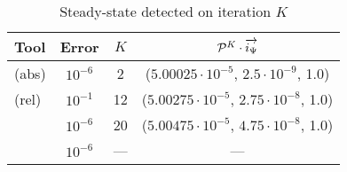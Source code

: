 \documentclass[times, 10pt,twocolumn]{article}
\begin{document}
	\begin{table}[h]
	{\footnotesize
		\caption{Steady-state detected on iteration $K$}
		\begin{center}
			\begin{tabular}{|l|c|c|c|}
				\hline
				Tool 		& Error &	$K$	& $\mathcal{P}^{K} \cdot \overrightarrow{i_{\Psi}}$ \\
				\hline
				\prism (abs)	& $10^{-6}$ &	 2	&	($5.00025 \cdot 10^{-5}$, $2.5 \cdot 10^{-9}$, 1.0) \\
				\prism (rel)	& $10^{-1}$ &	12	&	($5.00275 \cdot 10^{-5}$, $2.75 \cdot 10^{-8}$, 1.0) \\
				\etmcc		& $10^{-6}$ &	20	&	($5.00475 \cdot 10^{-5}$, $4.75 \cdot 10^{-8}$, 1.0) \\
				\mrmc		& $10^{-6}$ & ---	&	---	 \\
				\hline
			\end{tabular}
		\end{center}
		\label{tb:ssd_points}
		\vspace{-0.7cm}
	}
	\end{table}
	
\end{document}
